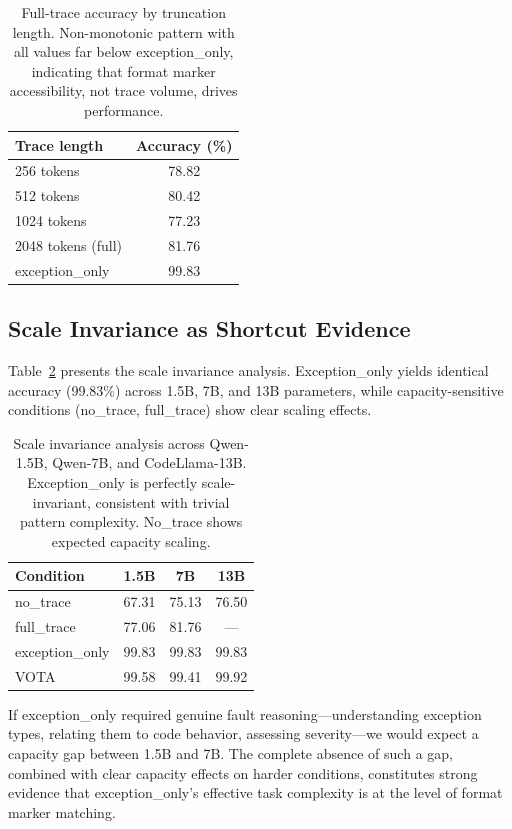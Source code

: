 \documentclass[11pt,a4paper]{article}
\begin{document}
\begin{table}[t]
\centering
\small
\begin{tabular}{lc}
\toprule
\textbf{Trace length} & \textbf{Accuracy (\%)} \\
\midrule
256 tokens & 78.82 \\
512 tokens & 80.42 \\
1024 tokens & 77.23 \\
2048 tokens (full) & 81.76 \\
\midrule
exception\_only & 99.83 \\
\bottomrule
\end{tabular}
\caption{Full-trace accuracy by truncation length. Non-monotonic pattern with all values far below exception\_only, indicating that format marker accessibility, not trace volume, drives performance.}
\label{tab:length}
\end{table}

\subsection{Scale Invariance as Shortcut Evidence}
\label{sec:format-engineering}

Table~\ref{tab:scale} presents the scale invariance analysis.
Exception\_only yields identical accuracy (99.83\%) across 1.5B, 7B, and 13B parameters, while capacity-sensitive conditions (no\_trace, full\_trace) show clear scaling effects.

\begin{table}[t]
\centering
\small
\begin{tabular}{lccc}
\toprule
\textbf{Condition} & \textbf{1.5B} & \textbf{7B} & \textbf{13B} \\
\midrule
no\_trace & 67.31 & 75.13 & 76.50 \\
full\_trace & 77.06 & 81.76 & --- \\
exception\_only & 99.83 & 99.83 & 99.83 \\
VOTA & 99.58 & 99.41 & 99.92 \\
\bottomrule
\end{tabular}
\caption{Scale invariance analysis across Qwen-1.5B, Qwen-7B, and CodeLlama-13B. Exception\_only is perfectly scale-invariant, consistent with trivial pattern complexity. No\_trace shows expected capacity scaling.}
\label{tab:scale}
\end{table}

If exception\_only required genuine fault reasoning---understanding exception types, relating them to code behavior, assessing severity---we would expect a capacity gap between 1.5B and 7B.
The complete absence of such a gap, combined with clear capacity effects on harder conditions, constitutes strong evidence that exception\_only's effective task complexity is at the level of format marker matching.
\end{document}

